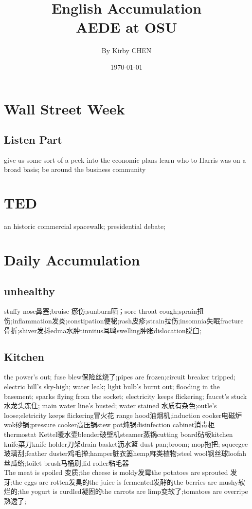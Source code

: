 \documentclass[a4paper,12pt]{article}
\title{
    \vspace{2cm} %
    \vspace{1cm} %
    \textbf{\Huge English Accumulation} \\
    \vspace{1cm} %
    \vspace{0.5cm} %
    \large AEDE at OSU
}
\author{By Kirby CHEN}
\date{\today}
\begin{document}
\maketitle
\thispagestyle{empty}
\newpage

\setcounter{page}{1}  %
\tableofcontents
\newpage

\section{Wall Street Week}
    \subsection{Listen Part}
give us some sort of a peek into the economic plans
learn who to Harris was on a broad basis; be around the business community 
\section{TED}
an historic commercial spacewalk; presidential debate;
\section{Daily Accumulation}
\subsection{unhealthy}
stuffy nose鼻塞;bruise 瘀伤;sunburn晒；sore throat cough;sprain扭伤;inflammation发炎;constipation便秘;rash皮疹;strain拉伤;insomnia失眠fracture骨折;shiver发抖edma水肿tinnitus耳鸣swelling肿胀dislocation脱臼;
\subsection{Kitchen}
the power's out; fuse blew保险丝烧了;pipes are frozen;circuit breaker tripped; electric bill's sky-high; water leak; light bulb's burnt out; flooding in the basement; sparks flying from the socket; electricity keeps flickering; faucet's stuck 水龙头冻住; 
main water line's busted; water stained 水质有杂色;outle's loose;eletricity keeps flickering冒火花
range hood油烟机;induction cooker电磁炉wok砂锅;pressure cooker高压锅stew pot炖锅disinfection cabinet消毒柜 thermostat Kettel暖水壶blender破壁机steamer蒸锅cutting board砧板kitchen knife菜刀knife holder刀架drain basket沥水篮
dust pan;broom; mop拖把; squeegee玻璃刮;feather duster鸡毛掸;hamper脏衣篓hemp麻类植物;steel wool钢丝球loofah丝瓜络;toilet brush马桶刷;lid roller粘毛器
\\The meat is spoiled 变质;the cheese is moldy发霉the potatoes are sprouted 发芽;the eggs are rotten发臭的the juice is fermented发酵的the berries are mushy软烂的;the yogurt is curdled凝固的the carrots are limp变软了;tomatoes are overripe熟透了;
\end{document}
